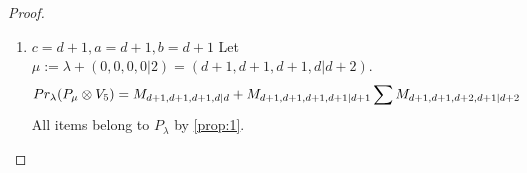 \begin{proof}
\begin{enumerate}
  \item $ c=d+1, a=d+1 ,b = d+1 $
        Let $\mu:=\lambda + (0,0,0,0|2) = (d+1,d+1,d+1,d|d+2) $.
        \begin{equation}\notag
          \begin{aligned}
            Pr_{\lambda}(P_\mu \otimes V_{5}) &=
M_{d+1,d+1,d+1,d|d}
+M_{d+1,d+1,d+1,d+1|d+1}
\sum M_{d+1,d+1,d+2,d+1|d+2}
          \end{aligned}
        \end{equation}
All items belong to $P_\lambda$ by \cref{prop:1}.

\end{enumerate}


\end{proof}
